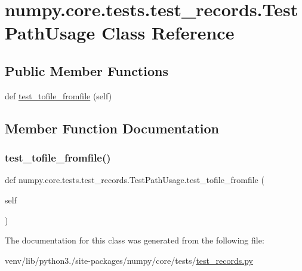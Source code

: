 \hypertarget{classnumpy_1_1core_1_1tests_1_1test__records_1_1TestPathUsage}{}\section{numpy.\+core.\+tests.\+test\+\_\+records.\+Test\+Path\+Usage Class Reference}
\label{classnumpy_1_1core_1_1tests_1_1test__records_1_1TestPathUsage}
\subsection*{Public Member Functions}
\begin{DoxyCompactItemize}
\item 
def \hyperlink{classnumpy_1_1core_1_1tests_1_1test__records_1_1TestPathUsage_a6bb533bfd00819c0ae58c50b144a1b06}{test\+\_\+tofile\+\_\+fromfile} (self)
\end{DoxyCompactItemize}


\subsection{Member Function Documentation}
\mbox{\label{classnumpy_1_1core_1_1tests_1_1test__records_1_1TestPathUsage_a6bb533bfd00819c0ae58c50b144a1b06}} 
\subsubsection{\texorpdfstring{test\+\_\+tofile\+\_\+fromfile()}{test\_tofile\_fromfile()}}
{\footnotesize\ttfamily def numpy.\+core.\+tests.\+test\+\_\+records.\+Test\+Path\+Usage.\+test\+\_\+tofile\+\_\+fromfile (\begin{DoxyParamCaption}\item[{}]{self }\end{DoxyParamCaption})}



The documentation for this class was generated from the following file\+:\begin{DoxyCompactItemize}
\item 
venv/lib/python3./site-\/packages/numpy/core/tests/\hyperlink{test__records_8py}{test\+\_\+records.\+py}\end{DoxyCompactItemize}
